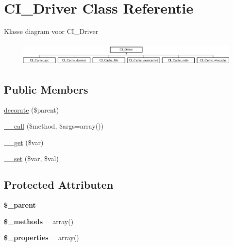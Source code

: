 \hypertarget{class_c_i___driver}{}\section{C\+I\+\_\+\+Driver Class Referentie}
\label{class_c_i___driver}
Klasse diagram voor C\+I\+\_\+\+Driver\begin{figure}[H]
\begin{center}
\leavevmode
\includegraphics[height=1.244444cm]{class_c_i___driver}
\end{center}
\end{figure}
\subsection*{Public Members}
\begin{DoxyCompactItemize}
\item 
\mbox{\hyperlink{class_c_i___driver_acf6a5ad6a84d4c7a27f463cbb618004b}{decorate}} (\$parent)
\item 
\mbox{\hyperlink{class_c_i___driver_a57936fde7f1adea3f3e7dfca474a1786}{\+\_\+\+\_\+call}} (\$method, \$args=array())
\item 
\mbox{\hyperlink{class_c_i___driver_a8fb2d9cdca17b87400e780b9f9720933}{\+\_\+\+\_\+get}} (\$var)
\item 
\mbox{\hyperlink{class_c_i___driver_a921783e9d7c3fb79479375193c9f3d1e}{\+\_\+\+\_\+set}} (\$var, \$val)
\end{DoxyCompactItemize}
\subsection*{Protected Attributen}
\begin{DoxyCompactItemize}
\item 
\mbox{\label{class_c_i___driver_a8c040f02d9e695416231845d2aaf7f59}} 
{\bfseries \$\+\_\+parent}
\item 
\mbox{\label{class_c_i___driver_a148e2042f169cec802078e58a46ace92}} 
{\bfseries \$\+\_\+methods} = array()
\item 
\mbox{\label{class_c_i___driver_a677f712430f384ffa402fac50940ace4}} 
{\bfseries \$\+\_\+properties} = array()
\end{DoxyCompactItemize}
